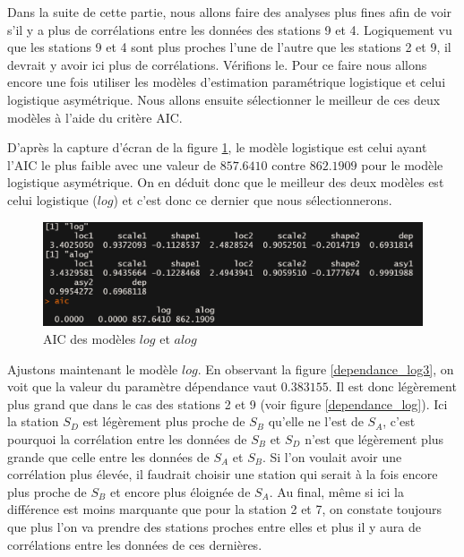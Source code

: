 \documentclass[a4paper,french,10pt]{article}
\begin{document}
Dans la suite de cette partie, nous allons faire des analyses plus fines afin de voir s'il y a plus de corrélations entre les données des stations 9 et 4. Logiquement vu que les stations 9 et 4 sont plus proches l'une de l'autre que les stations 2 et 9, il devrait y avoir ici plus de corrélations. Vérifions le. Pour ce faire nous allons encore une fois utiliser les modèles d'estimation paramétrique logistique et celui logistique asymétrique. Nous allons ensuite sélectionner le meilleur de ces deux modèles à l'aide du critère AIC.

\newpage

D'après la capture d'écran de la figure \ref{AIC_9_4}, le modèle logistique est celui ayant l'AIC le plus faible avec une valeur de $857.6410$ contre $862.1909$ pour le modèle logistique asymétrique. On en déduit donc que le meilleur des deux modèles est celui logistique ($log$) et c'est donc ce dernier que nous sélectionnerons.

\begin{figure}[htp] 
	\centering
	\includegraphics[scale=0.45]{images/AIC_stations9_4.png}
	\caption{AIC des modèles $log$ et $alog$}
	\label{AIC_9_4}
\end{figure}

Ajustons maintenant le modèle $log$. En observant la figure \ref{dependance_log3}, on voit que la valeur du paramètre dépendance vaut $0.383155$. Il est donc légèrement plus grand que dans le cas des stations 2 et 9 (voir figure \ref{dependance_log}). Ici la station $S_D$ est légèrement plus proche de $S_B$ qu'elle ne l'est de $S_A$, c'est pourquoi la corrélation entre les données de $S_B$ et $S_D$ n'est que légèrement plus grande que celle entre les données de $S_A$ et $S_B$. Si l'on voulait avoir une corrélation plus élevée, il faudrait choisir une station qui serait à la fois encore plus proche de $S_B$ et encore plus éloignée de $S_A$. Au final, même si ici la différence est moins marquante que pour la station 2 et 7, on constate toujours que plus l'on va prendre des stations proches entre elles et plus il y aura de corrélations entre les données de ces dernières.
\end{document}
